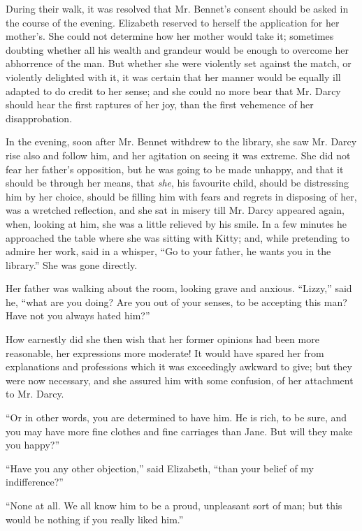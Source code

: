 During their walk, it was resolved that Mr. Bennet’s
consent should be asked in the course of the evening.
Elizabeth reserved to herself the application for her
mother’s. She could not determine how her mother
would take it; sometimes doubting whether all his wealth
and grandeur would be enough to overcome her abhorrence
of the man. But whether she were violently set
against the match, or violently delighted with it, it was
certain that her manner would be equally ill adapted to
do credit to her sense; and she could no more bear that
Mr. Darcy should hear the first raptures of her joy, than
the first vehemence of her disapprobation.

\strut

In the evening, soon after Mr. Bennet withdrew to the
library, she saw Mr. Darcy rise also and follow him, and
her agitation on seeing it was extreme. She did not fear
her father’s opposition, but he was going to be made
unhappy, and that it should be through her means, that
\textit{she}, his favourite child, should be distressing him by her
choice, should be filling him with fears and regrets in
disposing of her, was a wretched reflection, and she sat
in misery till Mr. Darcy appeared again, when, looking
at him, she was a little relieved by his smile. In a few
minutes he approached the table where she was sitting
with Kitty; and, while pretending to admire her work,
said in a whisper, “Go to your father, he wants you in
the library.” She was gone directly.

Her father was walking about the room, looking grave
and anxious. “Lizzy,” said he, “what are you doing?
Are you out of your senses, to be accepting this man?
Have not you always hated him?”

How earnestly did she then wish that her former
opinions had been more reasonable, her expressions more
moderate! It would have spared her from explanations
and professions which it was exceedingly awkward to
give; but they were now necessary, and she assured him
with some confusion, of her attachment to Mr. Darcy.

“Or in other words, you are determined to have him.
He is rich, to be sure, and you may have more fine clothes
and fine carriages than Jane. But will they make you
happy?”

“Have you any other objection,” said Elizabeth, “than
your belief of my indifference?”

“None at all. We all know him to be a proud, unpleasant
sort of man; but this would be nothing if you
really liked him.”


